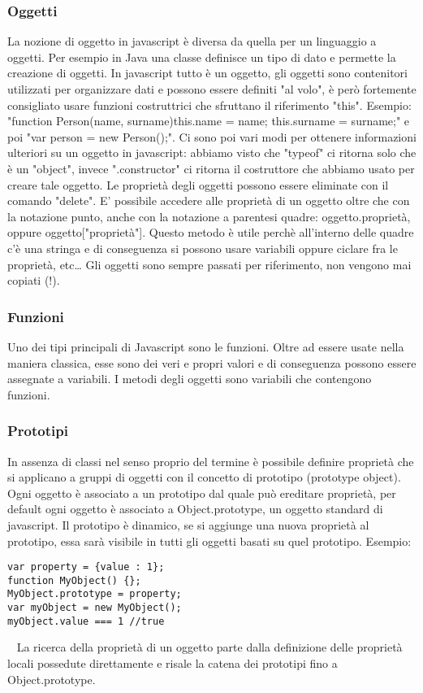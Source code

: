 \subsubsection{Oggetti}
La nozione di oggetto in javascript è diversa da quella per un linguaggio a oggetti. Per esempio in Java una classe definisce un tipo di dato e permette la creazione di oggetti. In javascript tutto è un oggetto, gli oggetti sono contenitori utilizzati per organizzare dati e possono essere definiti "al volo", è però fortemente consigliato usare funzioni costruttrici che sfruttano il riferimento "this". Esempio: "function Person(name, surname){this.name = name; this.surname = surname;}" e poi "var person = new Person();". Ci sono poi vari modi per ottenere informazioni ulteriori su un oggetto in javascript: abbiamo visto che "typeof" ci ritorna solo che è un "object", invece ".constructor" ci ritorna il costruttore che abbiamo usato per creare tale oggetto.\newline
\newline
Le proprietà degli oggetti possono essere eliminate con il comando "delete".\newline
\newline
E' possibile accedere alle proprietà di un oggetto oltre che con la notazione punto, anche con la notazione a parentesi quadre: oggetto.proprietà, oppure oggetto["proprietà"]. Questo metodo è utile perchè all'interno delle quadre c'è una stringa e di conseguenza si possono usare variabili oppure ciclare fra le proprietà, etc\dots \newline
\newline
Gli oggetti sono sempre passati per riferimento, non vengono mai copiati (!).
\subsubsection{Funzioni}
Uno dei tipi principali di Javascript sono le funzioni. Oltre ad essere usate nella maniera classica, esse sono dei veri e propri valori e di conseguenza possono essere assegnate a variabili. I metodi degli oggetti sono variabili che contengono funzioni.
\subsubsection{Prototipi}
In assenza di classi nel senso proprio del termine è possibile definire proprietà che si applicano a gruppi di oggetti con il concetto di prototipo (prototype object). Ogni oggetto è associato a un prototipo dal quale può ereditare proprietà, per default ogni oggetto è associato a Object.prototype, un oggetto standard di javascript. Il prototipo è dinamico, se si aggiunge una nuova proprietà al prototipo, essa sarà visibile in tutti gli oggetti basati su quel prototipo.\newline
Esempio:
\begin{lstlisting}
var property = {value : 1};
function MyObject() {};
MyObject.prototype = property;
var myObject = new MyObject();
myObject.value === 1 //true 
\end{lstlisting}
\ \newline
La ricerca della proprietà di un oggetto parte dalla definizione delle proprietà locali possedute direttamente e risale la catena dei prototipi fino a Object.prototype.
